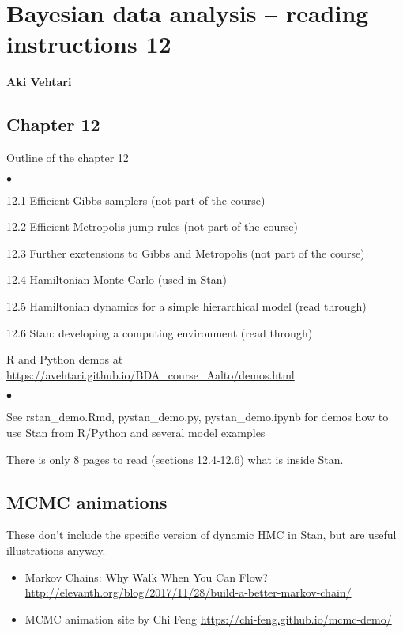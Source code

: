 \documentclass[a4paper,11pt,english]{article}
\begin{document}
\thispagestyle{empty}

\section*{Bayesian data analysis -- reading instructions 12} 
\smallskip
{\bf Aki Vehtari}
\smallskip

\subsection*{Chapter 12}

Outline of the chapter 12
\begin{list}{$\bullet$}{\parsep=0pt\itemsep=2pt}
\item 12.1 Efficient Gibbs samplers (not part of the course)
\item 12.2 Efficient Metropolis jump rules (not part of the course)
\item 12.3 Further exetensions to Gibbs and Metropolis (not part of the course)
\item 12.4 Hamiltonian Monte Carlo (used in Stan)
\item 12.5 Hamiltonian dynamics for a simple hierarchical model (read through)
\item 12.6 Stan: developing a computing environment (read through)
\end{list}

R and Python demos at \url{https://avehtari.github.io/BDA_course_Aalto/demos.html}
\begin{list}{$\bullet$}{\parsep=0pt\itemsep=2pt}
\item See rstan\_demo.Rmd, pystan\_demo.py, pystan\_demo.ipynb
  for demos how to use Stan from R/Python and several model examples
\end{list}

\noindent
There is only 8 pages to read (sections 12.4-12.6) what is inside Stan.

\subsection*{MCMC animations}

These don't include the specific version of dynamic HMC in Stan, but are useful illustrations anyway.
 \begin{itemize}
 \item Markov Chains: Why Walk When You Can Flow?\\ \url{http://elevanth.org/blog/2017/11/28/build-a-better-markov-chain/}
 \item MCMC animation site by Chi Feng \url{https://chi-feng.github.io/mcmc-demo/}
 \end{itemize}
\end{document}
